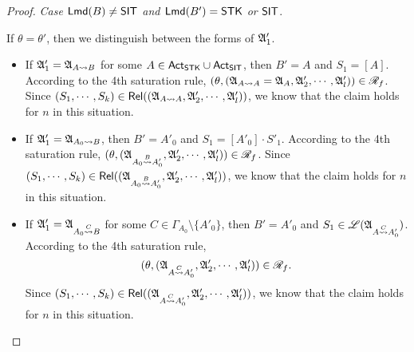 \begin{proof}
\noindent \emph{Case ${\sf Lmd}(B) \neq {\sf SIT}$ and ${\sf Lmd}(B') = {\sf STK}$ or ${\sf SIT}$}. 

If $\theta = \theta'$, then we distinguish between the forms of ${\mathfrak{A} }'_1$. 
\begin{itemize}
\item If ${\mathfrak{A} }'_1 = {\mathfrak{A} }_{A \rightsquigarrow B}$ for some $A \in {\sf Act}_{\sf STK} \cup {\sf Act}_{\sf SIT}$, then $B' = A$ and $S_1 = [A]$. According to the 4th saturation rule, $(\theta, ({\mathfrak{A} }_{A \rightsquigarrow A} = {\mathfrak{A} }_A, {\mathfrak{A} }'_2, \cdots, {\mathfrak{A} }'_l)) \in \mathscr{R}_f$. Since $(S_1, \cdots, S_k) \in \mathsf{Rel}(({\mathfrak{A} }_{A \rightsquigarrow A}, {\mathfrak{A} }'_2, \cdots, {\mathfrak{A} }'_l))$, we know that the claim holds for $n$ in this situation.

%
\item If ${\mathfrak{A} }'_1 = {\mathfrak{A} }_{A_0 \rightsquigarrow B}$, then $B' = A'_0$ and $S_1 = [A'_0] \cdot S'_1$.  According to the 4th saturation rule, $(\theta, ({\mathfrak{A} }_{A_0 \stackrel{B}{\rightsquigarrow} A'_0}, {\mathfrak{A} }'_2, \cdots, {\mathfrak{A} }'_l)) \in \mathscr{R}_f$. Since $(S_1, \cdots, S_k) \in \mathsf{Rel}(({\mathfrak{A} }_{A_0 \stackrel{B}{\rightsquigarrow} A'_0}, {\mathfrak{A} }'_2, \cdots, {\mathfrak{A} }'_l))$, we know that the claim holds for $n$ in this situation.

%
\item If ${\mathfrak{A} }'_1 = {\mathfrak{A} }_{A_0 \stackrel{C}{\rightsquigarrow} B}$ for some $C \in \Gamma_{A_0} \setminus \{A'_0\}$, then $B' = A'_0$ and $S_1 \in  {\mathscr{L} }({\mathfrak{A} }_{A \stackrel{C}{\rightsquigarrow} A'_0})$.  According to the 4th saturation rule, 
$$(\theta, ({\mathfrak{A} }_{A \stackrel{C}{\rightsquigarrow} A'_0}, {\mathfrak{A} }'_2, \cdots, {\mathfrak{A} }'_l)) \in \mathscr{R}_f.$$ 
Since $(S_1, \cdots, S_k) \in \mathsf{Rel}(({\mathfrak{A} }_{A \stackrel{C}{\rightsquigarrow} A'_0}, {\mathfrak{A} }'_2, \cdots, {\mathfrak{A} }'_l))$, we know that the claim holds for $n$ in this situation.
\end{itemize}


\end{proof}
